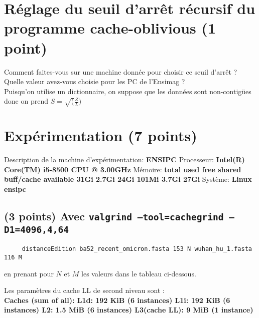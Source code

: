 \documentclass[10pt,a4paper]{article}
\begin{document}
\section{Réglage du seuil d'arrêt récursif du programme cache-oblivious (1 point)}
Comment faites-vous sur une machine donnée pour choisir ce seuil d'arrêt ? Quelle valeur avez-vous choisie pour les PC de l'Ensimag ? \\
Puisqu'on utilise un dictionnaire, on suppose que les données sont non-contigües donc on prend $ S = \sqrt(\frac{Z}{L}) $

\section{Expérimentation (7 points)}

Description de la machine d'expérimentation: \textbf{ENSIPC}
Processeur: \textbf{Intel(R) Core(TM) i5-8500 CPU @ 3.00GHz}
Mémoire: \textbf{total        used        free      shared  buff/cache   available
          31Gi       2.7Gi        24Gi       101Mi       3.7Gi        27Gi}
Système: \textbf{Linux ensipc}

\subsection{(3 points) Avec {\tt valgrind --tool=cachegrind --D1=4096,4,64}}
\begin{verbatim}
     distanceEdition ba52_recent_omicron.fasta 153 N wuhan_hu_1.fasta 116 M
\end{verbatim}
en prenant pour $N$ et $M$ les valeurs dans le tableau ci-dessous.

Les paramètres du cache LL de second niveau sont :\\ \textbf{Caches (sum of all):     
L1d:                   192 KiB (6 instances)
L1i:                   192 KiB (6 instances)
L2:                    1.5 MiB (6 instances)
L3(cache LL):          9 MiB (1 instance)
}
\end{document}
